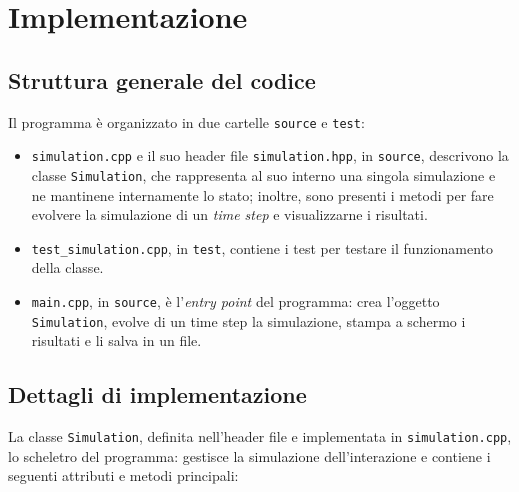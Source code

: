 \section{Implementazione}

\subsection{Struttura generale del codice}
Il programma è organizzato in due cartelle \verb|source| e \verb|test|:
\begin{itemize}
    \item \verb|simulation.cpp| e il suo header file \verb|simulation.hpp|, in \verb|source|, descrivono la classe \verb|Simulation|, che rappresenta al suo interno una singola simulazione e ne mantinene internamente lo stato; inoltre, sono presenti i metodi per fare evolvere la simulazione di un \textit{time step} e visualizzarne i risultati.
    \item \verb|test_simulation.cpp|, in \verb|test|, contiene i test per testare il funzionamento della classe.
    \item \verb|main.cpp|, in \verb|source|, è l'\textit{entry point} del programma: crea l'oggetto \verb|Simulation|, evolve di un time step la simulazione, stampa a schermo i risultati e li salva in un file.
\end{itemize}
\subsection{Dettagli di implementazione}
La classe \verb|Simulation|, definita nell'header file e implementata in \verb|simulation.cpp|, lo scheletro del programma: gestisce la simulazione dell'interazione e contiene i seguenti attributi e metodi principali:

